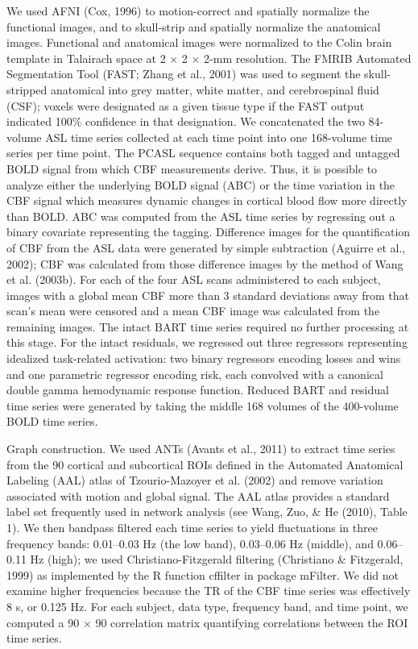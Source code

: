 We used AFNI (Cox, 1996) to motion-correct and spatially normalize the functional images, and to skull-strip and spatially normalize the anatomical images. Functional and anatomical images were normalized to the Colin brain template in Talairach space at 2 × 2 × 2-mm resolution. The FMRIB Automated Segmentation Tool (FAST; Zhang et al., 2001) was used to segment the skull-stripped anatomical into grey matter, white matter, and cerebrospinal fluid (CSF); voxels were designated as a given tissue type if the FAST output indicated 100\% confidence in that designation. 
We concatenated the two 84-volume ASL time series collected at each time point into one 168-volume time series per time point.  The PCASL sequence contains both tagged and untagged BOLD signal from which CBF measurements derive. Thus, it is possible to analyze either the underlying BOLD signal (ABC) or the time variation in the CBF signal which measures dynamic changes in cortical blood flow more directly than BOLD.   ABC was computed from the ASL time series by regressing out a binary covariate representing the tagging. Difference images for the quantification of CBF from the ASL data were generated by simple subtraction (Aguirre et al., 2002); CBF was calculated from those difference images by the method of Wang et al. (2003b). For each of the four ASL scans administered to each subject, images with a global mean CBF more than 3 standard deviations away from that scan’s mean were censored and a mean CBF image was calculated from the remaining images. 
	The intact BART time series required no further processing at this stage. For the intact residuals, we regressed out three regressors representing idealized task-related activation: two binary regressors encoding losses and wins and one parametric regressor encoding risk, each convolved with a canonical double gamma hemodynamic response function. Reduced BART and residual time series were generated by taking the middle 168 volumes of the 400-volume BOLD time series.

Graph construction. We used ANTs (Avants et al., 2011) to extract time series from the 90 cortical and subcortical ROIs defined in the Automated Anatomical Labeling (AAL) atlas of Tzourio-Mazoyer et al. (2002) and remove variation associated with motion and global signal.  The AAL atlas provides a standard label set frequently used in network analysis (see Wang, Zuo, \& He (2010), Table 1). We then bandpass filtered each time series to yield fluctuations in three frequency bands: 0.01–0.03 Hz (the low band), 0.03–0.06 Hz (middle), and 0.06–0.11 Hz (high); we used Christiano-Fitzgerald filtering (Christiano \& Fitzgerald, 1999) as implemented by the R function cffilter in  package mFilter. We did not examine higher frequencies because the TR of the CBF time series was effectively 8 s, or 0.125 Hz. For each subject, data type, frequency band, and time point, we computed a 90 × 90 correlation matrix quantifying correlations between the ROI time series. 

